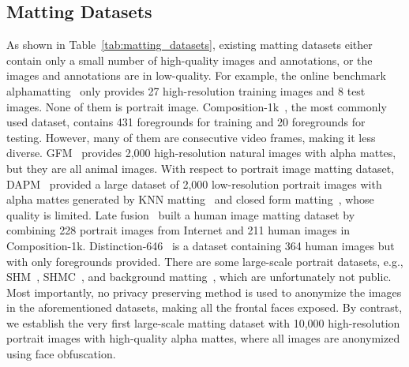\documentclass[twocolumn]{svjour3}
\begin{document}
\subsection{Matting Datasets}
As shown in Table~\ref{tab:matting_datasets}, existing matting datasets either contain only a small number of high-quality images and annotations, or the images and annotations are in low-quality. For example, the online benchmark alphamatting~\citep{TUW-180666} only provides 27 high-resolution training images and 8 test images. None of them is portrait image. Composition-1k~\citep{dim}, the most commonly used dataset, contains 431 foregrounds for training and 20 foregrounds for testing. However, many of them are consecutive video frames, making it less diverse. GFM~\citep{gfm} provides 2,000 high-resolution natural images with alpha mattes, but they are all animal images. With respect to portrait image matting dataset, DAPM~\citep{dapm} provided a large dataset of 2,000 low-resolution portrait images with alpha mattes generated by KNN matting~\citep{chen2013knn} and closed form matting~\citep{levin2007closed}, whose quality is limited. Late fusion~\citep{lf} built a human image matting dataset by combining 228 portrait images from Internet and 211 human images in Composition-1k. Distinction-646~\citep{hatt} is a dataset containing 364 human images but with only foregrounds provided. There are some large-scale portrait datasets, e.g., SHM~\citep{shm}, SHMC~\citep{shmc}, and background matting~\citep{backgroundmatting}, which are unfortunately not public. Most importantly, no privacy preserving method is used to anonymize the images in the aforementioned datasets, making all the frontal faces exposed. By contrast, we establish the very first large-scale matting dataset with 10,000 high-resolution portrait images with high-quality alpha mattes, where all images are anonymized using face obfuscation.
\end{document}
